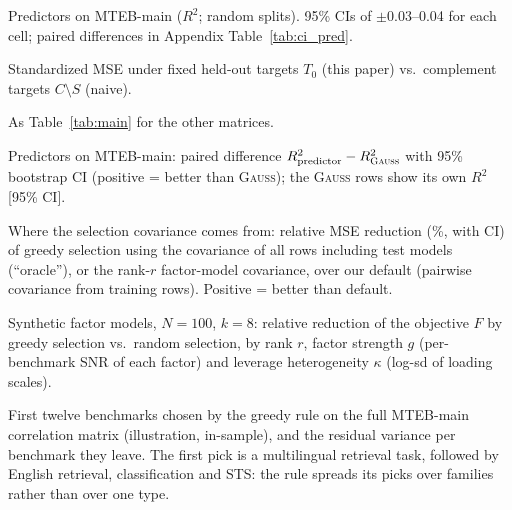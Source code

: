\begin{table}[h]
\centering\small
\caption{Predictors on MTEB-main ($R^2$; random splits). 95\% CIs of $\pm$0.03--0.04 for each cell; paired differences in Appendix Table~\ref{tab:ci_pred}.}
\label{tab:pred}

\end{table}

\begin{table}[h]
\centering\small
\caption{Standardized MSE under fixed held-out targets $T_0$ (this paper) vs.\ complement targets $C\setminus S$ (naive).}
\label{tab:bias}
\resizebox{\linewidth}{!}{}
\end{table}


\begin{table}[h]
\centering\small
\caption{As Table~\ref{tab:main} for the other matrices.}
\label{tab:main_app}
\resizebox{\linewidth}{!}{}
\end{table}

\begin{table}[h]
\centering\scriptsize
\caption{Predictors on MTEB-main: paired difference $R^2_{\text{predictor}}-R^2_{\textsc{Gauss}}$ with 95\% bootstrap CI (positive = better than \textsc{Gauss}); the \textsc{Gauss} rows show its own $R^2$ [95\% CI].}
\label{tab:ci_pred}
{\tiny\setlength{\tabcolsep}{2pt}}
\end{table}

\begin{table}[h]
\centering\small
\caption{Where the selection covariance comes from: relative MSE reduction (\%, with CI) of greedy selection using the covariance of all rows including test models (``oracle''), or the rank-$r$ factor-model covariance, over our default (pairwise covariance from training rows). Positive = better than default.}
\label{tab:oracle}
\resizebox{\linewidth}{!}{}
\end{table}

\begin{table}[h]
\centering\small
\caption{Synthetic factor models, $N=100$, $k=8$: relative reduction of the objective $F$ by greedy selection vs.\ random selection, by rank $r$, factor strength $g$ (per-benchmark SNR of each factor) and leverage heterogeneity $\kappa$ (log-sd of loading scales).}
\label{tab:e5}

\end{table}

\begin{table}[h]
\centering\small
\caption{First twelve benchmarks chosen by the greedy rule on the full MTEB-main correlation matrix (illustration, in-sample), and the residual variance per benchmark they leave. The first pick is a multilingual retrieval task, followed by English retrieval, classification and STS: the rule spreads its picks over families rather than over one type.}
\label{tab:picks}

\end{table}

